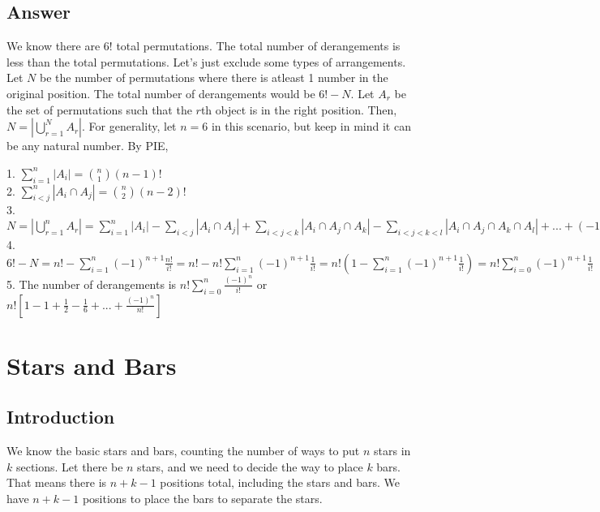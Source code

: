 \documentclass{article}
\begin{document}
\subsection{Answer}
We know there are $6!$ total permutations. The total
number of derangements is less than the total permutations.
Let's just exclude some types of arrangements. Let $N$ be
the number of permutations where there is atleast 1 number
in the original position. The total number of derangements
would be $6! - N$. Let $A_r$ be the set of permutations
such that the $r$th object is in the right position. Then,
$N = |\bigcup\limits_{r=1}^{N}A_r|$. For generality, let $n=6$ in
this scenario, but keep in mind it can be any natural number. By PIE,\\
\begin{center}
    \begin{large}
        1. $\sum\limits_{i=1}^{n}{|A_i|} = \binom{n}{1}(n-1)!$\\
        2.  $\sum\limits_{i<j}^{n}{|A_i \cap A_j|} = \binom{n}{2}(n-2)!$\\
        3. $N = |\bigcup\limits_{r=1}^{n}A_r|
            = \sum\limits_{i=1}^{n}{|A_i|}
            - \sum\limits_{i<j}{|A_i \cap A_j|}
            + \sum\limits_{i<j<k}{|A_i \cap A_j \cap A_k|}
            - \sum\limits_{i<j<k<l}
            {|A_i\cap{A_j}\cap{A_k}\cap{A_l}|} + ...
            + (-1)^{n+1}|A_1 \cap A_2 \cap ... \cap A_n|
            = \sum\limits_{i=1}^{n}{\binom{n}{i}(-1)^{n+1}
            (n-i)!}=\sum\limits_{i=1}^{n}{(-1)^{n+1}\frac{n!}{i!}}$\\
        4. $6! - N = n! - \sum\limits_{i=1}^{n}{(-1)^{n+1}\frac{n!}{i!}}
            = n! - n!\sum\limits_{i=1}^{n}{(-1)^{n+1}\frac{1}{i!}}
            = n!(1-\sum\limits_{i=1}^{n}{(-1)^{n+1}\frac{1}{i!}})
            = n!\sum\limits_{i=0}^{n}{(-1)^{n+1}\frac{1}{i!}}$\\
        5. The number of derangements is
        $\boxed{n!\sum\limits_{i=0}^{n}{\frac{(-1)^{n}}{i!}}}$ or
        $\boxed{n![1-1+\frac{1}{2}-\frac{1}{6}+...+\frac{(-1)^n}{n!}]}$
    \end{large}
\end{center}
\section{Stars and Bars}
\subsection{Introduction}
We know the basic stars and bars, counting the number of ways
to put $n$ stars in $k$ sections. Let there be $n$ stars,
and we need to decide the way to place $k$ bars. That means
there is $n + k - 1$ positions total, including the stars
and bars. We have $n + k - 1$ positions to place the bars to 
separate the stars.
\end{document}
